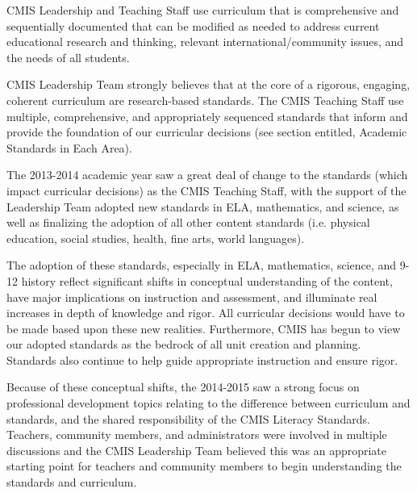 \documentclass{report}
\begin{document}

\begin{findings}
CMIS Leadership and Teaching Staff use curriculum that is comprehensive and sequentially documented  that can be modified as needed to address current educational research and thinking, relevant international/community issues, and the needs of all students.

CMIS Leadership Team strongly believes that at the core of a rigorous, engaging, coherent curriculum are research-based standards. The  CMIS Teaching Staff use multiple, comprehensive, and appropriately sequenced standards that inform and provide the foundation of our curricular decisions (see section entitled, Academic Standards in Each Area). 

The 2013-2014 academic year saw a great deal of change to the standards (which impact curricular decisions) as the CMIS Teaching Staff, with the support of the Leadership Team adopted new standards in ELA, mathematics, and science, as well as finalizing the adoption of all other content standards (i.e. physical education, social studies, health, fine arts, world languages). 

The adoption of these standards, especially in ELA, mathematics, science, and 9-12 history  reflect significant shifts in conceptual understanding of the content, have major implications on instruction and assessment, and illuminate real increases in depth of knowledge and rigor. All curricular decisions would have to be made based upon these new realities. Furthermore, CMIS has begun to view our adopted standards as the bedrock of all unit creation and planning. Standards also continue to help guide appropriate instruction and ensure rigor. 

Because of these conceptual shifts, the 2014-2015 saw a strong focus on professional development topics relating to the difference between curriculum and standards, and the shared responsibility of the CMIS Literacy Standards. Teachers, community members, and administrators were involved in multiple discussions and the CMIS Leadership Team believed this was an appropriate starting point for teachers and community members to begin understanding the standards and curriculum.
\end{findings}
\end{document}
